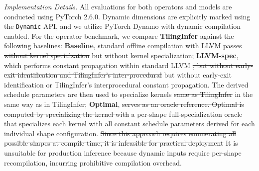 \documentclass[manuscript,screen,review]{acmart}
\theoremstyle{indenteditalic}
\providecommand{\DIFaddtex}[1]{{\protect\color{blue}#1}} %
\providecommand{\DIFidentity}[1]{#1}
\providecommand{\DIFdeltex}[1]{{%
  \protect\color{red}%
  \normalfont\normalsize
  \let\textbf\DIFidentity
  \let\textit\DIFidentity
  \let\texttt\DIFidentity
  \let\textsc\DIFidentity
  \let\textsf\DIFidentity
  \let\emph\DIFidentity
  \let\uline\DIFidentity
  \sout{#1}%
}} %
\providecommand{\DIFaddbegin}{} %
\providecommand{\DIFaddend}{} %
\providecommand{\DIFdelbegin}{} %
\providecommand{\DIFdelend}{} %
\providecommand{\DIFadd}[1]{\texorpdfstring{\DIFaddtex{#1}}{#1}} %
\providecommand{\DIFdel}[1]{\texorpdfstring{\DIFdeltex{#1}}{}} %
\begin{document}

\DIFdelend \textit{Implementation Details.}
All evaluations for both operators and models are conducted using PyTorch 2.6.0.
Dynamic dimensions are explicitly marked using the \texttt{Dynamic} API, and we utilize PyTorch Dynamo with dynamic compilation enabled.
For the operator benchmark, we compare \textbf{TilingInfer} against the following baselines:
\textbf{Baseline}, standard offline compilation with LLVM passes \DIFdel{without kernel specialzation}\DIFadd{but without kernel specialization};
\textbf{LLVM-spec}, which performs constant propagation within standard LLVM\DIFdel{, but without early-exit identification and TilingInfer's inter-procedural}\DIFadd{ but without early-exit identification or TilingInfer's interprocedural} constant propagation. The derived schedule parameters are then used to specialize kernels \DIFdel{same as TilingInfer}\space\DIFadd{in the same way as in TilingInfer};
\textbf{Optimal}, \DIFdel{serves as an oracle reference. \textbf{Optimal} is computed by specializing the kernel with}\space\DIFadd{a per-shape full-specialization oracle that specializes each kernel with} \DIFaddbegin \DIFadd{all constant }\DIFaddend schedule parameters derived for each individual shape configuration.
\DIFdelbegin \DIFdel{Since this approach requires enumerating all possible shapes at compile time, it is infeasible for practical deployment}\DIFdelend \DIFaddbegin \DIFadd{It is unsuitable for production inference because dynamic inputs require per-shape recompilation, incurring prohibitive compilation overhead}\DIFaddend .
\end{document}
